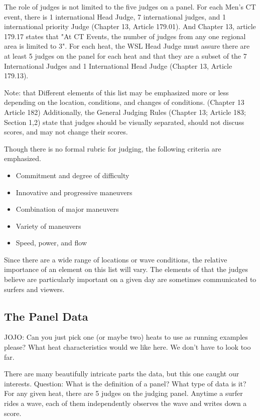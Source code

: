 \documentclass{article}
\theoremstyle{definition}
\begin{document}
The role of judges is not limited to the five judges on a panel. For each Men's CT event, there is 1 international Head Judge, 7 international judges, and 1 international priority Judge (Chapter 13, Article 179.01). And Chapter 13, article 179.17 states that "At CT Events, the number of judges from any one regional area is limited to 3". For each heat, the WSL Head Judge must assure there are at least 5 judges on the panel for each heat and that they are a subset of the 7 International Judges and 1 International Head Judge (Chapter 13, Article 179.13).

Note: that Different elements of this list may be emphasized more or less depending on the location, conditions, and changes of conditions. (Chapter 13 Article 182) Additionally, the General Judging Rules (Chapter 13; Article 183; Section 1,2) state that judges should be visually separated, should not discuss scores, and may not change their scores.

Though there is no formal rubric for judging, the following criteria are emphasized.
\begin{itemize}
\item Commitment and degree of difficulty
\item Innovative and progressive maneuvers
\item Combination of major maneuvers
\item Variety of maneuvers
\item Speed, power, and flow
\end{itemize}
Since there are a wide range of locations or wave conditions, the relative importance of an element on this list will vary. The elements of that the judges believe are particularly important on a given day are sometimes communicated to surfers and viewers.

\subsection{The Panel Data}
JOJO: Can you just pick one (or maybe two) heats to use as running examples please? What heat characteristics would we like here. We don't have to look too far.

There are many beautifully intricate parts the data, but this one caught our interests.
Question: What is the definition of a panel? What type of data is it?
For any given heat, there are 5 judges on the judging panel. Anytime a surfer rides a wave, each of them independently observes the wave and writes down a score. 
\end{document}
